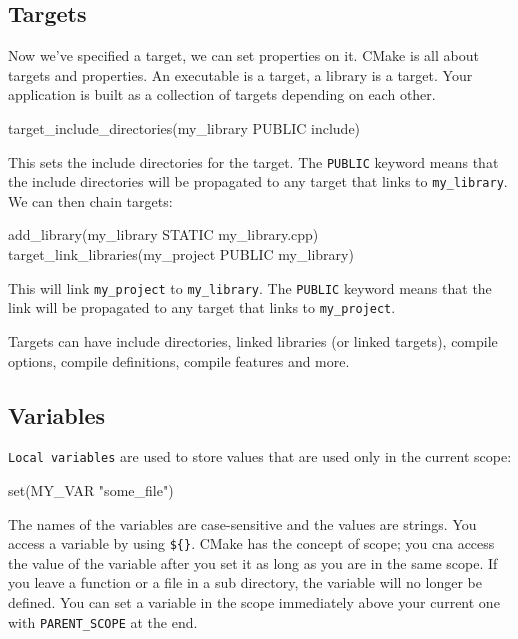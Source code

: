 \subsection{Targets}

Now we've specified a target, we can set properties on it.
CMake is all about targets and properties. An executable is a target, a library is a target. Your
application is built as a collection of targets depending on each other.


\begin{codeblock}[language=C++, numbers=none]
target_include_directories(my_library PUBLIC include)
\end{codeblock}

This sets the include directories for the target. The \texttt{PUBLIC} keyword means that the include directories will be propagated to any target that links to \texttt{my\_library}.
We can then chain targets:

\begin{codeblock}[language=C++, numbers=none]
add_library(my_library STATIC my_library.cpp)
target_link_libraries(my_project PUBLIC my_library)
\end{codeblock}

This will link \texttt{my\_project} to \texttt{my\_library}. The \texttt{PUBLIC} keyword means that the link will be propagated to any target that links to \texttt{my\_project}.

Targets can have include directories, linked libraries (or linked targets), compile options, compile definitions, 
compile features and more.

\subsection{Variables}

\texttt{Local variables} are used to store values that are used only in the current scope:

\begin{codeblock}[language=C++, numbers=none]
set(MY_VAR "some_file") 
\end{codeblock}

The names of the variables are case-sensitive and the values are strings. You access a variable by using \texttt{\$\{\}}.
CMake has the concept of scope; you cna access the value of the variable after you set it as long as you are in the same scope. If you leave a function or a file in a sub directory, the variable will 
no longer be defined. You can set a variable in the scope immediately above your current one with \texttt{PARENT\_SCOPE} at the end. 

